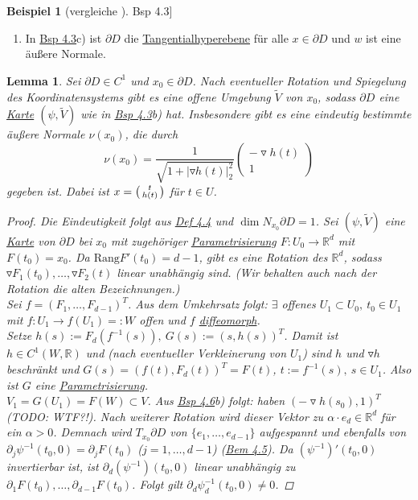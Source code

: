 \documentclass[a4paper]{scrreprt}
\newcommand{\R}{\mathbb{R}}
\newenvironment{jsmallmatrix}{\left( \begin{smallmatrix}}{\end{smallmatrix} \right)}
\newcommand{\jlabel}[1]{\label{j_#1}}
\newcommand{\jhyperref}[2]{\hyperref[j_#1]{#2}}
\newcommand{\jlink}[1]{\jhyperref{#1}{#1}}
\newcommand{\jabb}[3]{ #1: #2 \rightarrow #3 }
\theoremstyle{plain}
\newtheorem{lem}[thm]{Lemma}
\theoremstyle{definition}
\newtheorem{expl}[thm]{Beispiel}
\begin{document}
{{{{\begin{expl}[vergleiche \jlink{Bsp 4.3}]
\begin{enumerate}
        \item In \jlink{Bsp 4.3}c) ist $\partial D$ die \jlink{Tangentialhyperebene} für alle $x\in\partial D$ und $w$ ist eine äußere Normale.
    \end{enumerate}
\end{expl}

\begin{lem}
    \jlabel{Lem 4.7}
    Sei $\partial D \in C^1$ und $x_0\in \partial D$. Nach eventueller Rotation und Spiegelung des Koordinatensystems gibt es eine offene Umgebung $\tilde{V}$ von $x_0$, sodass $\partial D$ eine \jlink{Karte} $(\psi, \tilde{V})$ wie in \jlink{Bsp 4.3}b) hat. Insbesondere gibt es eine eindeutig bestimmte äußere Normale $\nu(x_0)$, die durch
    \[
        \nu(x_0) = \frac{1}{\sqrt{1 + |\triangledown h(t)|_2^2}} \begin{pmatrix}
                                                                     -\triangledown h(t) \\
                                                                     1
                                                                 \end{pmatrix}
    \]
    gegeben ist. Dabei ist $x = \begin{jsmallmatrix} t \\ h(t) \end{jsmallmatrix}$ für $t\in U$.
    \begin{proof}
        Die Eindeutigkeit folgt aus \jlink{Def 4.4} und $\dim N_{x_0} \partial D = 1$. Sei $(\psi, \tilde{V})$ eine \jlink{Karte} von $\partial D$ bei $x_0$ mit zugehöriger \jlink{Parametrisierung} $\jabb{F}{U_0}{\R^d}$ mit $F(t_0) = x_0$. Da $\text{Rang} F'(t_0) = d-1$, gibt es eine Rotation des $\R^d$, sodass $\triangledown F_1(t_0),\dots, \triangledown F_2(t)$ linear unabhängig sind. (Wir behalten auch nach der Rotation die alten Bezeichnungen.)\\
        Sei $f = (F_1,\dots, F_{d-1})^T$. Aus dem Umkehrsatz folgt: $\exists$ offenes $U_1\subset U_0,\ t_0 \in U_1$ mit $\jabb{f}{U_1}{f(U_1)} =: W$ offen und $f$ \jlink{diffeomorph}.\\
        Setze $h(s) := F_d(f^{-1}(s)), \ G(s) := (s, h(s))^T$. Damit ist $h\in C^1(W,\R)$ und (nach eventueller Verkleinerung von $U_1$) sind $h$ und $\triangledown h$ beschränkt und $G(s) = (f(t), F_d(t))^T = F(t)$, $t := f^{-1}(s), \ s\in U_1$. Also ist $G$ eine \jlink{Parametrisierung}.\\
        $V_1 = G(U_1) = F(W) \subset V$. Aus \jlink{Bsp 4.6}b) folgt: haben $(-\triangledown h(s_0), 1)^T$ (TODO: WTF?!). Nach weiterer Rotation wird dieser Vektor zu $\alpha\cdot e_d \in \R^d$ für ein $\alpha >0$. Demnach wird $T_{x_0} \partial D$ von $\{e_1,\dots,e_{d-1}\}$ aufgespannt und ebenfalls von $\partial_j \psi^{-1}(t_0,0) = \partial_j F(t_0)$ ($j=1,\dots, d-1$) (\jlink{Bem 4.5}). Da $(\psi^{-1})'(t_0,0)$ invertierbar ist, ist $\partial_d(\psi^{-1})(t_0,0)$ linear unabhängig zu $\partial_1 F(t_0),\dots,\partial_{d-1}F(t_0)$. Folgt gilt $\partial_d \psi^{-1}_d(t_0,0) \ne 0$.
        

\end{proof}
\end{lem}}}}}
\end{document}
